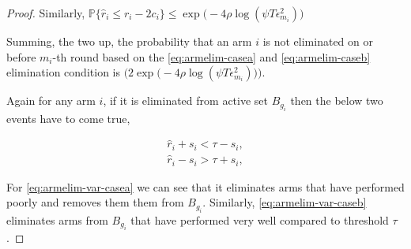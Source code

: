 \begin{proof}
  

Similarly, $\mathbb{P}\lbrace\hat{r}_{i}\leq r_{i} - 2c_{i}\rbrace\leq \exp\big(-4\rho\log (\psi T\epsilon_{m_{i}}^{2})\big)$
 

Summing, the two up, the probability that an arm ${i}$ is not eliminated on or before $m_{i}$-th round based on the \ref{eq:armelim-casea} and \ref{eq:armelim-caseb} elimination condition is  $\bigg(2\exp\big(-4\rho\log (\psi T\epsilon_{m_{i}}^{2})\big)\bigg)$. 


Again for any arm $i$, if it is eliminated from active set $B_{g_{i}}$ then the below two events have to come true,
\begin{small}
\begin{align}
\hat{r}_{i} + s_{i} < \tau - s_{i}, \label{eq:armelim-var-casea}\\
\hat{r}_{i} - s_{i} > \tau + s_{i}, \label{eq:armelim-var-caseb}
\end{align}
\end{small}

For \ref{eq:armelim-var-casea} we can see that it eliminates arms that have performed poorly and removes them them from $B_{g_{i}}$. Similarly, \ref{eq:armelim-var-caseb} eliminates arms from $B_{g_{i}}$ that have performed very well compared to threshold $\tau$.



\end{proof}
